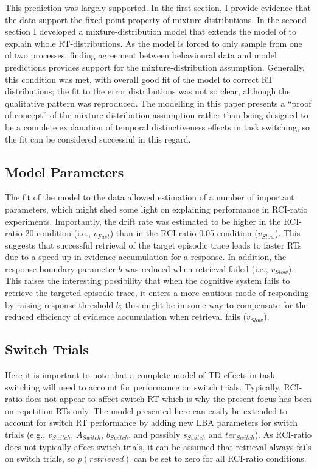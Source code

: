 \documentclass[a4paper, man, natbib]{apa6}
\begin{document}
This prediction was largely supported. In the first section, I provide evidence that the data support the fixed-point property of mixture distributions. In the second section I developed a mixture-distribution model that extends the model of \cite{Grange2015} to explain whole RT-distributions. As the model is forced to only sample from one of two processes, finding agreement between behavioural data and model predictions provides support for the mixture-distribution assumption. Generally, this condition was met, with overall good fit of the model to correct RT distributions; the fit to the error distributions was not so clear, although the qualitative pattern was reproduced. The modelling in this paper presents a ``proof of concept'' of the mixture-distribution assumption rather than being designed to be a complete explanation of temporal distinctiveness effects in task switching, so the fit can be considered successful in this regard.

\subsection{Model Parameters}
The fit of the model to the data allowed estimation of a number of important parameters, which might shed some light on explaining performance in RCI-ratio experiments. Importantly, the drift rate was estimated to be higher in the RCI-ratio 20 condition (i.e., $v_{Fast}$) than in the RCI-ratio 0.05 condition ($v_{Slow}$). This suggests that successful retrieval of the target episodic trace leads to faster RTs due to a speed-up in evidence accumulation for a response. In addition, the response boundary parameter $b$ was reduced when retrieval failed (i.e., $v_{Slow}$). This raises the interesting possibility that when the cognitive system fails to retrieve the targeted episodic trace, it enters a more cautious mode of responding by raising response threshold $b$; this might be in some way to compensate for the reduced efficiency of evidence accumulation when retrieval fails ($v_{Slow}$).

\subsection{Switch Trials}
Here it is important to note that a complete model of TD effects in task switching will need to account for performance on switch trials. Typically, RCI-ratio does not appear to affect switch RT \citep{Horoufchin2011, Horoufchin2011a} which is why the present focus has been on repetition RTs only. The model presented here can easily be extended to account for switch RT performance by adding new LBA parameters for switch trials (e.g., $v_{Switch}$, $A_{Switch}$, $b_{Switch}$, and possibly $s_{Switch}$ and  $ter_{Switch}$). As RCI-ratio does not typically affect switch trials, it can be assumed that retrieval always fails on switch trials, so $p(retrieved)$ can be set to zero for all RCI-ratio conditions. 
\end{document}

